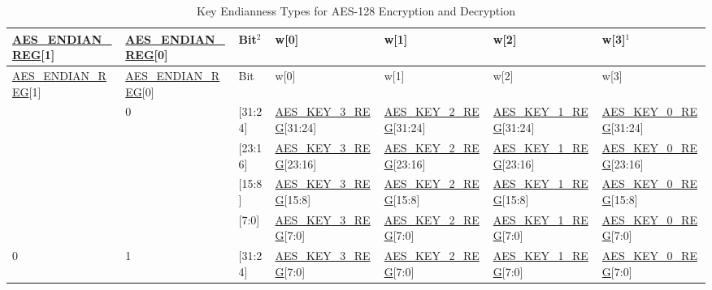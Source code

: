 \documentclass[main\_\_EN.tex]{subfiles}
\begin{document}
\begin{landscape}

\begin{tiny}
\begin{longtable}[c]
{ |p{2cm}|p{2cm}|p{1cm}|p{2.5cm}|p{2.5cm}|p{2.5cm}|p{2.5cm}|}
\caption{Key Endianness Types for AES-128 Encryption and Decryption}\label{table:AES128KeyEndian}\\
\hline
\rowcolor{lightgray}
\hyperref[regdesc:AESENDIANREG]{AES\_ENDIAN\_REG}[1]    &   \hyperref[regdesc:AESENDIANREG]{AES\_ENDIAN\_REG}[0]    &   Bit$^2$ &   w[0]    &   w[1]    &   w[2]    &   w[3]$^1$    \\\hline
\endfirsthead
\hline
\rowcolor{lightgray}
\hyperref[regdesc:AESENDIANREG]{AES\_ENDIAN\_REG}[1]    &   \hyperref[regdesc:AESENDIANREG]{AES\_ENDIAN\_REG}[0]    &   Bit &   w[0]    &   w[1]    &   w[2]    &   w[3]    \\\hline
\endhead
\endfoot
\multirow{4}{4cm}{0}    &   \multirow{4}{4cm}{0}    &   [31:24]     &   \hyperref[regdesc:AESKEYnREG]{AES\_KEY\_3\_REG}[31:24]  &   \hyperref[regdesc:AESKEYnREG]{AES\_KEY\_2\_REG}[31:24]  & \hyperref[regdesc:AESKEYnREG]{AES\_KEY\_1\_REG}[31:24]    &   \hyperref[regdesc:AESKEYnREG]{AES\_KEY\_0\_REG}[31:24]\\
\cline{3-7}
&&  [23:16]     &   \hyperref[regdesc:AESKEYnREG]{AES\_KEY\_3\_REG}[23:16]  &   \hyperref[regdesc:AESKEYnREG]{AES\_KEY\_2\_REG}[23:16]  &   \hyperref[regdesc:AESKEYnREG]{AES\_KEY\_1\_REG}[23:16]  &   \hyperref[regdesc:AESKEYnREG]{AES\_KEY\_0\_REG}[23:16]\\
\cline{3-7}
&&  [15:8]  &   \hyperref[regdesc:AESKEYnREG]{AES\_KEY\_3\_REG}[15:8]   &   \hyperref[regdesc:AESKEYnREG]{AES\_KEY\_2\_REG}[15:8]   &   \hyperref[regdesc:AESKEYnREG]{AES\_KEY\_1\_REG}[15:8]   &   \hyperref[regdesc:AESKEYnREG]{AES\_KEY\_0\_REG}[15:8]\\
\cline{3-7}
&&  [7:0]   &   \hyperref[regdesc:AESKEYnREG]{AES\_KEY\_3\_REG}[7:0]    &   \hyperref[regdesc:AESKEYnREG]{AES\_KEY\_2\_REG}[7:0]    &   \hyperref[regdesc:AESKEYnREG]{AES\_KEY\_1\_REG}[7:0]    &   \hyperref[regdesc:AESKEYnREG]{AES\_KEY\_0\_REG}[7:0]\\
\hline
\multirow{4}{4cm}{0}    &   \multirow{4}{4cm}{1}    &   [31:24]     &   \hyperref[regdesc:AESKEYnREG]{AES\_KEY\_3\_REG}[7:0]    &   \hyperref[regdesc:AESKEYnREG]{AES\_KEY\_2\_REG}[7:0]    &   \hyperref[regdesc:AESKEYnREG]{AES\_KEY\_1\_REG}[7:0]    &   \hyperref[regdesc:AESKEYnREG]{AES\_KEY\_0\_REG}[7:0]\\

\end{longtable}
\end{tiny}
\end{landscape}
\end{document}
